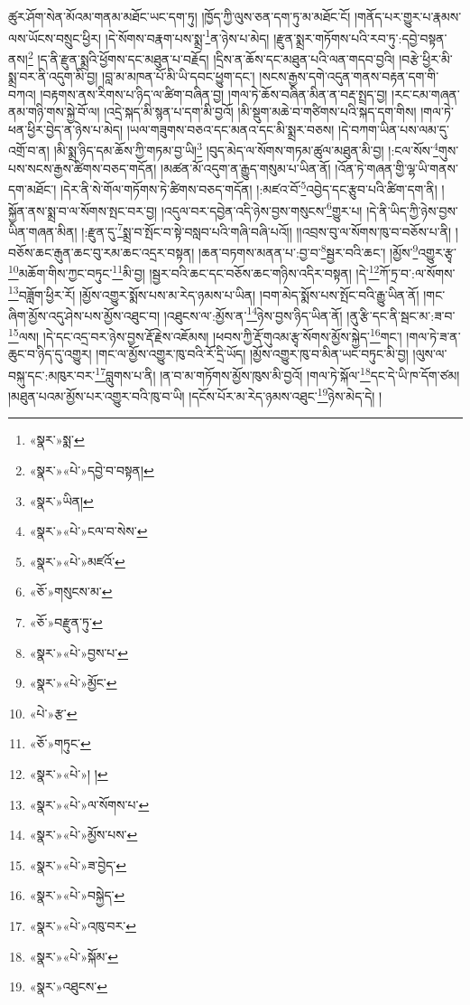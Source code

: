 ཚུར་ཤོག་སེན་མོའམ་གནམ་མཐོང་ཡང་དག་ཏུ། །ཁྱོད་ཀྱི་ལུས་ཅན་དག་ཏུ་མ་མཐོང་ངོ། །གནོད་པར་གྱུར་པ་རྣམས་ལས་ཡོངས་བསྲུང་ཕྱིར། །དེ་སོགས་བརྣག་པས་སྨྲ་\footnote{«སྣར་»སྨ་}ན་ཉེས་པ་མེད། །རྫུན་སྨྲར་གཏོགས་པའི་རབ་ཏུ་:དབྱེ་བསྟན་ནས།\footnote{«སྣར་»«པེ་»དབྱེ་བ་བསྟན།} །ད་ནི་རྫུན་སྨྲའི་ཕྱོགས་དང་མཐུན་པ་བརྗོད། །དྲིས་ན་ཆོས་དང་མཐུན་པའི་ལན་གདབ་བྱའི། །བརྩེ་ཕྱིར་མི་སྨྲ་བར་ནི་འདུག་མི་བྱ། །བླ་མ་མཁན་པོ་མི་ཡི་དབང་ཕྱུག་དང་། །སངས་རྒྱས་དགེ་འདུན་གནས་བརྟན་དག་གི་བཀའ། །བརྟགས་ནས་རིགས་པ་ཉིད་ལ་ཚིག་བཞིན་བྱ། །གལ་ཏེ་ཆོས་བཞིན་མིན་ན་བརྡ་སྤྲད་བྱ། །རང་ངམ་གཞན་ནམ་གཉི་གས་སྐྱེ་བོ་ལ། །འདྲེ་སྐད་མི་སྙན་པ་དག་མི་བྱའོ། །མི་སྡུག་མཆེ་བ་གཙིགས་པའི་སྐད་དག་གིས། །གལ་ཏེ་ཕན་ཕྱིར་བྱེད་ན་ཉེས་པ་མེད། །ཡལ་གཟུགས་བཅའ་དང་མནའ་དང་མི་སྨྲར་བཅས། །དེ་བཀག་ཡིན་པས་ལམ་དུ་འགྲོ་བ་ན། །མི་སྨྲ་ཉིད་དམ་ཆོས་ཀྱི་གཏམ་བྱ་ཡི།\footnote{«སྣར་»ཡིན།} །བུད་མེད་ལ་སོགས་གཏམ་ཚུལ་མཐུན་མི་བྱ། །:ངལ་སོས་\footnote{«སྣར་»«པེ་»ངལ་བ་སེས་}གུས་པས་སངས་རྒྱས་ཚིགས་བཅད་གདོན། །མཚན་མོ་འདུག་ན་རྒྱུད་གསུམ་པ་ཡིན་ནོ། །འོན་ཏེ་གཞན་གྱི་ལྷ་ཡི་གནས་དག་མཐོང་། །དེར་ནི་སེ་གོལ་གཏོགས་ཏེ་ཚིགས་བཅད་གདོན། །:མཛའ་བོ་\footnote{«སྣར་»«པེ་»མཛའོ་}འབྱེད་དང་རྩུབ་པའི་ཚིག་དག་ནི། །སྐྱོན་ནས་སྨྲ་བ་ལ་སོགས་སྤང་བར་བྱ། །འདུལ་བར་དབྱེན་འདི་ཉེས་བྱས་གསུངས་\footnote{«ཅོ་»གསུངས་མ་}གྱུར་པ། །དེ་ནི་ཡིད་ཀྱི་ཉེས་བྱས་ཡིན་གཞན་མིན། །:རྫུན་དུ་\footnote{«ཅོ་»བརྫུན་ཏུ་}སྨྲ་བ་སྤོང་བ་སྟེ་བསླབ་པའི་གཞི་བཞི་པའོ།། །།འབྲས་བུ་ལ་སོགས་ཁུ་བ་བཅོས་པ་ནི། །བཅོས་ཆང་རྒུན་ཆང་བུ་རམ་ཆང་འདྲར་བསྟན། །ཆན་བཏགས་མནན་པ་:བྱ་བ་\footnote{«སྣར་»«པེ་»བྱས་པ་}སྦྱར་བའི་ཆང་། །མྱོས་\footnote{«སྣར་»«པེ་»མྱོང་}འགྱུར་རྩྭ་\footnote{«པེ་»རྩ་}མཆོག་གིས་ཀྱང་བཏུང་\footnote{«ཅོ་»གཏུང་}མི་བྱ། །སྦྱར་བའི་ཆང་དང་བཅོས་ཆང་གཉིས་འདིར་བསྟན། །དེ་\footnote{«སྣར་»«པེ་»། །}ཀོ་ཏྲ་བ་:ལ་སོགས་\footnote{«སྣར་»«པེ་»ལ་སོགས་པ་}བཟློག་ཕྱིར་རོ། །མྱོས་འགྱུར་སྨོས་པས་མ་རེད་ཉམས་པ་ཡིན། །བག་མེད་སྨོས་པས་སྤོང་བའི་རྒྱུ་ཡིན་ནོ། །གང་ཞིག་མྱོས་འདུ་ཤེས་པས་མྱོས་འཐུང་བ། །འཐུངས་ལ་:མྱོས་ན་\footnote{«སྣར་»«པེ་»མྱོས་པས་}ཉེས་བྱས་ཉིད་ཡིན་ནོ། །ནུ་རྩི་དང་ནི་སྦང་མ་:ཟ་བ་\footnote{«སྣར་»«པེ་»ཟ་བྱེད་}ལས། །དེ་དང་འདྲ་བར་ཉེས་བྱས་རྡོ་རྗེས་འཇོམས། །ཕབས་ཀྱི་རྡོ་གུའམ་རྩྭ་སོགས་མྱོས་སྐྱེད་\footnote{«སྣར་»«པེ་»བསྐྱེད་}གང་། །གལ་ཏེ་ཟ་ན་ཆུང་བ་ཉིད་དུ་འགྱུར། །གང་ལ་མྱོས་འགྱུར་ཁུ་བའི་རོ་དྲི་ཡོད། །མྱོས་འགྱུར་ཁུ་བ་མིན་ཡང་བཏུང་མི་བྱ། །ལུས་ལ་བསྐུ་དང་:མཁུར་བར་\footnote{«སྣར་»«པེ་»འཁུ་བར་}བླུགས་པ་ནི། །ན་བ་མ་གཏོགས་མྱོས་ཁུས་མི་བྱའོ། །གལ་ཏེ་སྐོལ་\footnote{«སྣར་»«པེ་»སྐོམ་}དང་དེ་ཡི་ཁ་དོག་ཙམ། །མཐུན་པའམ་མྱོས་པར་འགྱུར་བའི་ཁུ་བ་ཡི། །དངོས་པོར་མ་རེད་ཉམས་འཐུང་\footnote{«སྣར་»འཐུངས་}ཉེས་མེད་དེ། །
